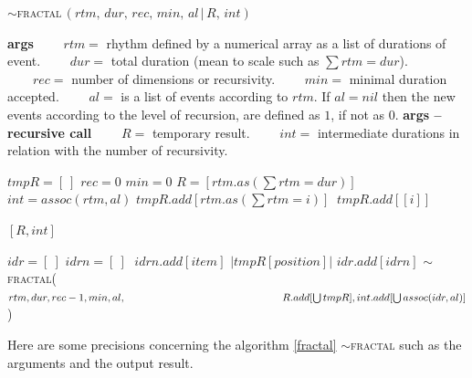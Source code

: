 \begin{algorithm}[H]
\caption{$\sim$\textsc{fractal}$\,(rtm,\, dur,\, rec,\, min,\, al\,|\,R,\, int)$}\label{fra}
\begin{algorithmic}%
\State \textbf{args}
\State $\qquad rtm =$ rhythm defined by a numerical array as a list of durations of  event.
\State $\qquad dur =$ total duration (mean to scale such as $\sum rtm = dur$).
\State $\qquad rec =$ number of dimensions or recursivity.
\State $\qquad min =$ minimal duration accepted.
\State $\qquad al =$ is a list of events according to $rtm$. If $al = nil$ then the new events according to the level of recursion, are defined as $1$, if not as $0$.
\State \textbf{args -- recursive call}
\State $\qquad R =$ temporary result.
\State $\qquad int =$ intermediate durations in relation with the number of recursivity.
\State

\State $tmpR=[\:]$
 $rec=0$
\EndIf
{} $min=0$
\EndIf
{} $R=[rtm.as(\sum rtm=dur)]$
\EndIf
{}
$int = assoc(rtm, al)$
\EndIf
{}
 $tmpR.add[rtm.as(\sum rtm=i)]$
\Else $\: tmpR.add[[i]]$
\EndIf
\EndFor

\State
{}

\Return $[R,int]$
\Else

\State $idr=[\:]$
\State $idrn=[\:]$
\Repeat $\;idrn.add[item]$ 
\Until $| tmpR[position] |$
\State $idr.add[idrn]$
\EndFor
\State $\sim$\textsc{fractal}($rtm, dur, rec-1, min, al, \newline
        \hspace*{15em} R.add[\bigcup tmpR], int.add[\bigcup assoc(idr, al)]$)

\EndIf

\end{algorithmic}
\end{algorithm}


 Here are some precisions concerning the algorithm \ref{fractal} $\sim$\textsc{fractal} such as the arguments and the output result.
 
